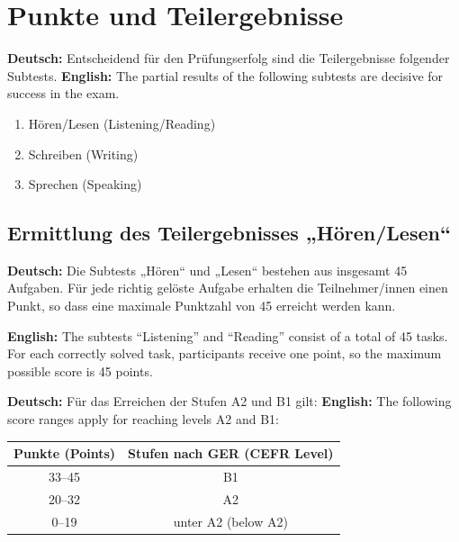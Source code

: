 \documentclass[a4paper]{article}
\title{}
\date{}
\begin{document}
    \maketitle
    
    
    \section{Punkte und Teilergebnisse}
        
        \textbf{Deutsch:} Entscheidend für den Prüfungserfolg sind die Teilergebnisse folgender Subtests.
        \textbf{English:} The partial results of the following subtests are decisive for success in the exam.
        
        \begin{enumerate}
            \item Hören/Lesen \quad (Listening/Reading)
            \item Schreiben \quad (Writing)
            \item Sprechen \quad (Speaking)
        \end{enumerate}
        
        \subsection{Ermittlung des Teilergebnisses „Hören/Lesen“}
            
            \textbf{Deutsch:} Die Subtests „Hören“ und „Lesen“ bestehen aus insgesamt 45 Aufgaben. Für jede richtig gelöste Aufgabe erhalten die Teilnehmer/innen einen Punkt, so dass eine maximale Punktzahl von 45 erreicht werden kann.
            
            \textbf{English:} The subtests “Listening” and “Reading” consist of a total of 45 tasks. For each correctly solved task, participants receive one point, so the maximum possible score is 45 points.
            
            \textbf{Deutsch:} Für das Erreichen der Stufen A2 und B1 gilt:
            \textbf{English:} The following score ranges apply for reaching levels A2 and B1:
            
            \begin{table}[H]
                \centering
                \begin{tabular}{|c|c|}
                    \hline
                    Punkte (Points) & Stufen nach GER (CEFR Level) \\
                    \hline
                    33--45          & B1                           \\
                    20--32          & A2                           \\
                    0--19           & unter A2 (below A2)          \\
                    \hline
                \end{tabular}
            \end{table}
        
      
\end{document}

